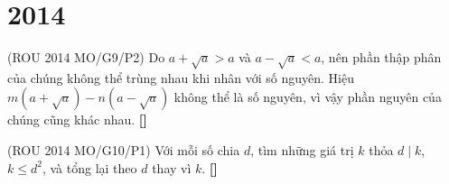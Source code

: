 \documentclass[./m.tex]{subfiles}
\begin{document}
\section{2014}

\begin{hint*}(\gls{ROU 2014 MO}/G9/P2)
	Do \( a+\sqrt{a} > a \) và \( a-\sqrt{a} < a \), nên phần thập phân của chúng không thể trùng nhau khi nhân với số nguyên.
	Hiệu \( m(a+\sqrt{a}) - n(a-\sqrt{a}) \) không thể là số nguyên, vì vậy phần nguyên của chúng cũng khác nhau.
	\textbf{[]}
\end{hint*}

\vspace{1em}

\begin{hint*}(\gls{ROU 2014 MO}/G10/P1)
	Với mỗi số chia \( d \), tìm những giá trị \( k \) thỏa \( d \mid k \), \( k \le d^2 \), và tổng lại theo \( d \) thay vì \( k \).
	\textbf{[]}
\end{hint*}
\end{document}
